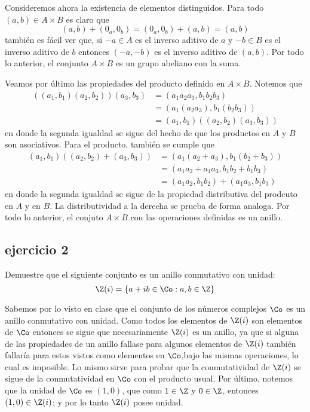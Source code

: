 \begin{sol}
	Consideremos ahora la existencia de elementos distinguidos. Para todo $(a,b) \in A \times B$ es claro que
	$$ (a,b) + (0_a,0_b) = (0_a,0_b) + (a,b) = (a,b) $$
	también es fácil ver que, si $-a \in A$ es el inverso aditivo de $a$ y $-b \in B$ es el inverso aditivo de $b$ entonces $(-a,-b)$ es el inverso aditivo de $(a,b)$. Por todo lo anterior, el conjunto $A \times B$ es un grupo abeliano con la suma.
	
	Veamos por último las propiedades del producto definido en $A \times B$. Notemos que
	\begin{align*}
	((a_1,b_1)(a_2,b_2))(a_3,b_3) &= (a_1a_2a_3,b_1b_2b_3) \\
								  &= (a_1(a_2a_3),b_1(b_2b_3)) \\
								  &= (a_1,b_1)((a_2,b_2)(a_3,b_3))
	\end{align*} 
	en donde la segunda igualdad se sigue del hecho de que los productos en $A$ y $B$ son asociativos. Para el producto, también se cumple que
	\begin{align*}
	(a_1,b_1) ((a_2,b_2)+(a_3,b_3)) &= (a_1(a_2+a_3),b_1(b_2+b_3)) \\
									&= (a_1a_2+a_1a_3,b_1b_2+b_1b_3) \\
									&= (a_1a_2,b_1b_2) + (a_1a_3,b_1b_3)
	\end{align*}
	en donde la segunda igualdad se sigue de la propiedad distributiva del prodcuto en $A$ y en $B$. La distributividad a la derecha se prueba de forma analoga.
	Por todo lo anterior, el conjuto $A \times B$ con las operaciones definidas es un anillo.
\end{sol}
\subsection*{ejercicio 2}
	Demuestre que el siguiente conjunto es un anillo conmutativo con unidad: 
\[ \Z (i) = \{a+ib \in \Co : a,b \in \Z \} \]
\begin{sol}
	Sabemos por lo visto en clase que el conjunto de los números complejos $\Co$ es un anillo conmutativo con unidad. Como todos los elementos de $\Z (i)$ son elementos de $\Co$ entonces se sigue que necesariamente $\Z (i)$ es un anillo, ya que si alguna de las propiedades de un anillo fallase para algunos elementos de $\Z (i)$ también fallaría para estos vistos como elementos en $\Co$,bajo las mismas operaciones, lo cual es imposible. Lo mismo sirve para probar que la conmutatividad de $\Z (i)$ se sigue de la conmutatividad en $\Co$ con el producto usual. Por último, notemos que la unidad de $\Co$ es $(1,0)$, que como $1 \in \Z$ y $0 \in \Z$, entonces $(1,0) \in \Z (i)$; y por lo tanto $\Z (i)$ posee unidad.
\end{sol}
